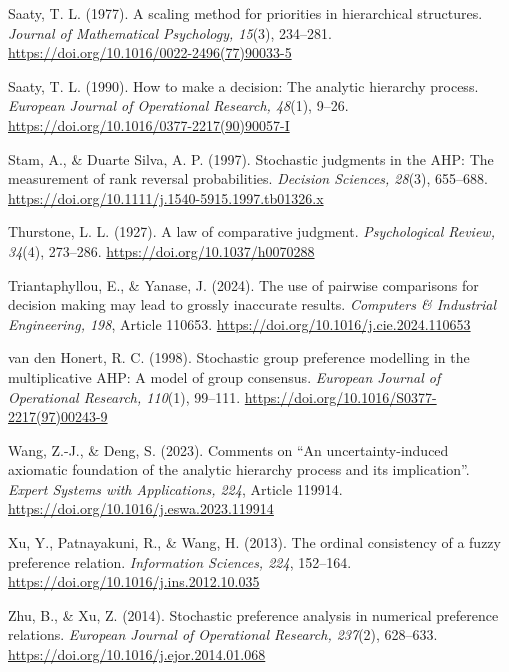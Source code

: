 \documentclass[11pt]{amsart}
\theoremstyle{definition}
\theoremstyle{plain}
\numberwithin{equation}{section}
\begin{document}
\begin{thebibliography}{}
Saaty, T. L. (1977).
A scaling method for priorities in hierarchical structures.
\textit{Journal of Mathematical Psychology, 15}(3), 234--281.
\url{https://doi.org/10.1016/0022-2496(77)90033-5}

Saaty, T. L. (1990).
How to make a decision: The analytic hierarchy process.
\textit{European Journal of Operational Research, 48}(1), 9--26.
\url{https://doi.org/10.1016/0377-2217(90)90057-I}

Stam, A., \& Duarte Silva, A. P. (1997).
Stochastic judgments in the AHP: The measurement of rank reversal probabilities.
\textit{Decision Sciences, 28}(3), 655--688.
\url{https://doi.org/10.1111/j.1540-5915.1997.tb01326.x}

Thurstone, L. L. (1927).
A law of comparative judgment.
\textit{Psychological Review, 34}(4), 273--286.
\url{https://doi.org/10.1037/h0070288}

Triantaphyllou, E., \& Yanase, J. (2024).
The use of pairwise comparisons for decision making may lead to grossly inaccurate results.
\textit{Computers \& Industrial Engineering, 198}, Article 110653.
\url{https://doi.org/10.1016/j.cie.2024.110653}

van den Honert, R. C. (1998).
Stochastic group preference modelling in the multiplicative AHP: A model of group consensus.
\textit{European Journal of Operational Research, 110}(1), 99--111.
\url{https://doi.org/10.1016/S0377-2217(97)00243-9}

Wang, Z.-J., \& Deng, S. (2023).
Comments on ``An uncertainty-induced axiomatic foundation of the analytic hierarchy process and its implication''.
\textit{Expert Systems with Applications, 224}, Article 119914.
\url{https://doi.org/10.1016/j.eswa.2023.119914}

Xu, Y., Patnayakuni, R., \& Wang, H. (2013).
The ordinal consistency of a fuzzy preference relation.
\textit{Information Sciences, 224}, 152--164.
\url{https://doi.org/10.1016/j.ins.2012.10.035}

Zhu, B., \& Xu, Z. (2014).
Stochastic preference analysis in numerical preference relations.
\textit{European Journal of Operational Research, 237}(2), 628--633.
\url{https://doi.org/10.1016/j.ejor.2014.01.068}

\end{thebibliography}
\end{document}
